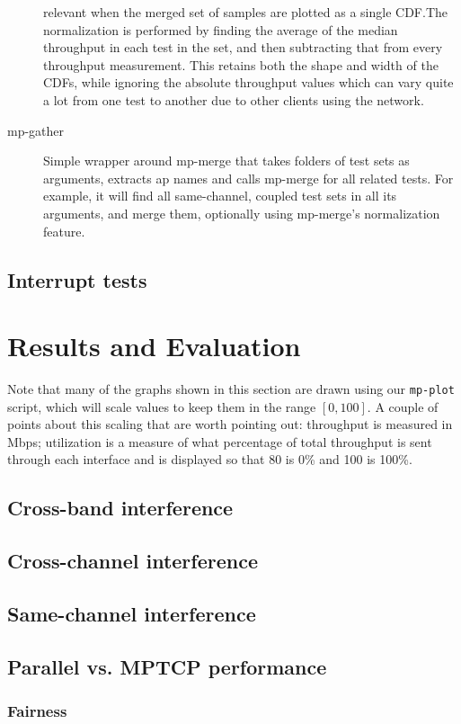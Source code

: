 \documentclass[12pt,a4paper]{article}
\begin{document}
\begin{description}
    relevant when the merged set of samples are plotted as a single CDF.\@ The
    normalization is performed by finding the average of the median throughput
    in each test in the set, and then subtracting that from every throughput
    measurement. This retains both the shape and width of the CDFs, while
    ignoring the absolute throughput values which can vary quite a lot from one
    test to another due to other clients using the network.
  \item[mp-gather]
    Simple wrapper around mp-merge that takes folders of test sets as arguments,
    extracts ap names and calls mp-merge for all related tests. For example, it
    will find all same-channel, coupled test sets in all its arguments, and
    merge them, optionally using mp-merge's normalization feature.
\end{description}
\subsection{Interrupt tests}

\section{Results and Evaluation}
Note that many of the graphs shown in this section are drawn using our
\texttt{mp-plot} script, which will scale values to keep them in the range
$[0,100]$. A couple of points about this scaling that are worth pointing out:
throughput is measured in Mbps; utilization is a measure of what percentage of
total throughput is sent through each interface and is displayed so that 80 is
0\% and 100 is 100\%.
\subsection{Cross-band interference} %
\subsection{Cross-channel interference}
\subsection{Same-channel interference}
\subsection{Parallel vs. MPTCP performance}
\subsubsection{Fairness}
\end{document}
